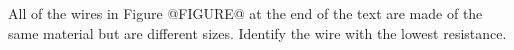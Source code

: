 All of the wires 
in Figure @FIGURE@ at the end of the text
are made of the same material but are different 
sizes. Identify the wire with the lowest resistance.
